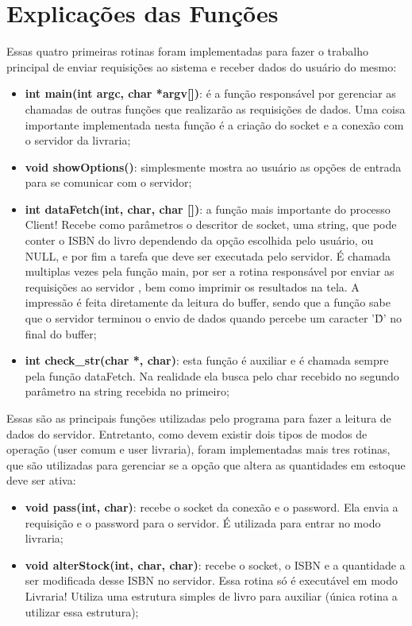 \documentclass[10pt,a4paper]{report}
\begin{document}
\section{Explicações das Funções}
Essas quatro primeiras rotinas foram implementadas para fazer o trabalho principal de enviar requisições ao sistema e receber dados do usuário do mesmo:
\begin{itemize}
\item \textbf{int main(int argc, char *argv[])}: é a função responsável por gerenciar as chamadas de outras funções que realizarão as requisições de dados. Uma coisa importante implementada nesta função é a criação do socket e a conexão com o servidor da livraria;
\item \textbf{void showOptions()}: simplesmente mostra ao usuário as opções de entrada para se comunicar com o servidor;
\item \textbf{int dataFetch(int, char, char [])}: a função mais importante do processo Client! Recebe como parâmetros o descritor de socket,  uma string, que pode conter o ISBN do livro dependendo da opção escolhida pelo usuário, ou NULL, e por fim a tarefa que deve ser executada pelo servidor. É chamada multiplas vezes pela função main, por ser a rotina responsável por enviar as requisições ao servidor , bem como imprimir os resultados na tela. A impressão é feita diretamente da leitura do buffer, sendo que a função sabe que o servidor terminou o envio de dados quando percebe um caracter '\^D' no final do buffer;
\item \textbf{int check\_str(char *, char)}: esta função é auxiliar e é chamada sempre pela função dataFetch. Na realidade ela busca pelo char recebido no segundo parâmetro na string recebida no primeiro;
\end{itemize}

	Essas são as principais funções utilizadas pelo programa para fazer a leitura de dados do servidor. Entretanto, como devem existir dois tipos de modos de operação (user comum e user livraria),  foram implementadas mais tres rotinas, que são utilizadas para gerenciar se a opção que altera as quantidades em estoque deve ser ativa:
\begin{itemize}
\item \textbf{void pass(int, char)}: recebe o socket da conexão e o password. Ela envia a requisição e o password para o servidor. É utilizada para entrar no modo livraria;
\item \textbf{void alterStock(int, char, char)}: recebe o socket, o ISBN e a quantidade a ser modificada desse ISBN no servidor. Essa rotina só é executável em modo Livraria! Utiliza uma estrutura simples de livro para auxiliar (única rotina a utilizar essa estrutura);
\end{itemize}
\end{document}
